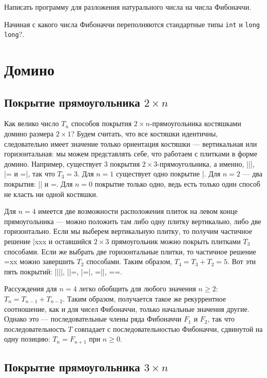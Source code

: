 \documentclass[14pt,openany]{book}
\begin{document}
\begin{task}
Написать программу для разложения натурального числа на числа Фибоначчи.
\end{task}

\begin{task}
Начиная с какого числа Фибоначчи переполняются стандартные типы \texttt{int} и \texttt{long long}?.
\end{task}

\section{Домино}

\subsection{Покрытие прямоугольника $2\times n$}

Как велико число $T_n$ способов покрытия $2\times n$-прямоугольника костяшками домино размера
$2\times 1$? Будем считать, что все костяшки идентичны, следовательно имеет значение только
ориентация костяшки --- вертикальная или горизонтальная: мы можем представлять себе, что
работаем с плитками в форме домино. Например, существует $3$ покрытия $2\times 3$-прямоугольника,
а именно, |||, |= и =|, так что $T_3 = 3$. Для $n=1$ существует одно покрытие |. Для $n=2$
--- два покрытия: || и =. Для $n=0$ покрытие только одно, ведь есть только один
способ не класть ни одной костяшки.

Для $n=4$ имеется две возможности расположения плиток на левом конце прямоугольника
--- можно положить там либо одну плитку вертикально, либо две горизонтально. Если мы выберем
вертикальную плитку, то получим частичное решение |xxx и оставшийся $2\times 3$ прямоугольник
можно покрыть плитками $T_3$ способами. Если же выбрать две горизонтальные плитки, то
частичное решение =xx можно завершить $T_2$ способами. Таким образом, $T_4=T_3+T_2=5$.
Вот эти пять покрытий: ||||, ||=, |=|, =||, ==.

Рассуждения для $n=4$ легко обобщить для любого значения $n \ge 2$: $T_n = T_{n-1} + T_{n-2}$.
Таким образом, получается такое же рекуррентное соотношение, как и для чисел Фибоначчи,
только начальные значения другие. Однако это --- последовательные члены ряда Фибоначчи
$F_1$ и $F_2$, так что последовательность $T$ совпадает с последовательностью Фибоначчи,
сдвинутой на одну позицию: $T_n = F_{n+1} \text{ при $n \ge 0$}$.

\subsection{Покрытие прямоугольника $3\times n$}
\end{document}
